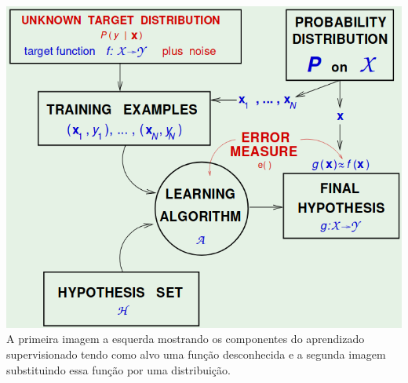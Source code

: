 \documentclass[12pt]{article}
\begin{document}
\begin{enumerate}
\begin{addmargin}[1em]{2em}
		\includegraphics[scale=.3]{"images/SupervisedLearning-b"}\\
			A primeira imagem a esquerda mostrando os componentes do aprendizado supervisionado tendo como alvo uma função desconhecida e a segunda imagem substituindo essa função por uma distribuição.
	\end{addmargin}

\pagebreak


\end{enumerate}
\end{document}
